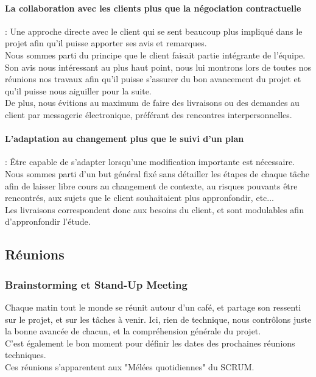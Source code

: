 \paragraph{La collaboration avec les clients plus que la négociation contractuelle} : Une approche directe avec le client qui se sent beaucoup plus impliqué dans le projet afin qu’il puisse apporter ses avis et remarques.\\

Nous sommes parti du principe que le client faisait partie intégrante de l'équipe. Son avis nous intéressant au plus haut point, nous lui montrons lors de toutes nos réunions nos travaux afin qu'il puisse s'assurer du bon avancement du projet et qu'il puisse nous aiguiller pour la suite.\\
De plus, nous évitions au maximum de faire des livraisons ou des demandes au client par messagerie électronique, préférant des rencontres interpersonnelles.


\paragraph{L’adaptation au changement plus que le suivi d’un plan} :
Être capable de s’adapter lorsqu’une modification importante est nécessaire.\\

Nous sommes parti d'un but général fixé sans détailler les étapes de chaque tâche afin de laisser libre cours au changement de contexte, au risques pouvants être rencontrés, aux sujets que le client souhaitaient plus appronfondir, etc...\\
Les livraisons correspondent donc aux besoins du client, et sont modulables afin d'appronfondir l'étude.

\subsection{Réunions}

\subsubsection{Brainstorming et Stand-Up Meeting}

Chaque matin tout le monde se réunit autour d'un café, et partage son ressenti sur le projet, et sur les tâches à venir. Ici, rien de technique, nous contrôlons juste la bonne avancée de chacun, et la compréhension générale du projet. \\
C'est également le bon moment pour définir les dates des prochaines réunions techniques.\\
Ces réunions s'apparentent aux "Mélées quotidiennes" du SCRUM.

